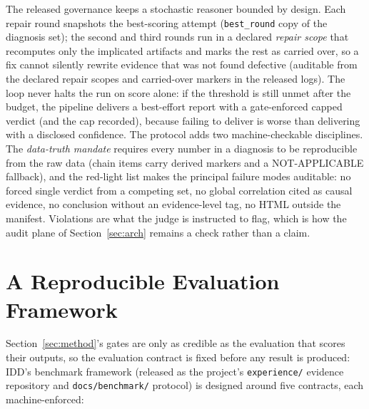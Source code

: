 \documentclass[preprint,10pt]{elsarticle}
\begin{document}
The released governance keeps a stochastic reasoner bounded by design. Each repair round snapshots the best-scoring attempt (\texttt{best\_round} copy of the diagnosis set); the second and third rounds run in a declared \emph{repair scope} that recomputes only the implicated artifacts and marks the rest as carried over, so a fix cannot silently rewrite evidence that was not found defective (auditable from the declared repair scopes and carried-over markers in the released logs). The loop never halts the run on score alone: if the threshold is still unmet after the budget, the pipeline delivers a best-effort report with a gate-enforced capped verdict (and the cap recorded), because failing to deliver is worse than delivering with a disclosed confidence. The protocol adds two machine-checkable disciplines. The \emph{data-truth mandate} requires every number in a diagnosis to be reproducible from the raw data (chain items carry derived markers and a NOT-APPLICABLE fallback), and the red-light list makes the principal failure modes auditable: no forced single verdict from a competing set, no global correlation cited as causal evidence, no conclusion without an evidence-level tag, no HTML outside the manifest. Violations are what the judge is instructed to flag, which is how the audit plane of Section~\ref{sec:arch} remains a check rather than a claim.

\section{A Reproducible Evaluation Framework}
\label{sec:framework}

Section~\ref{sec:method}'s gates are only as credible as the evaluation that scores their outputs, so the evaluation contract is fixed before any result is produced: IDD's benchmark framework (released as the project's \texttt{experience/} evidence repository and \texttt{docs/benchmark/} protocol) is designed around five contracts, each machine-enforced:
\end{document}
